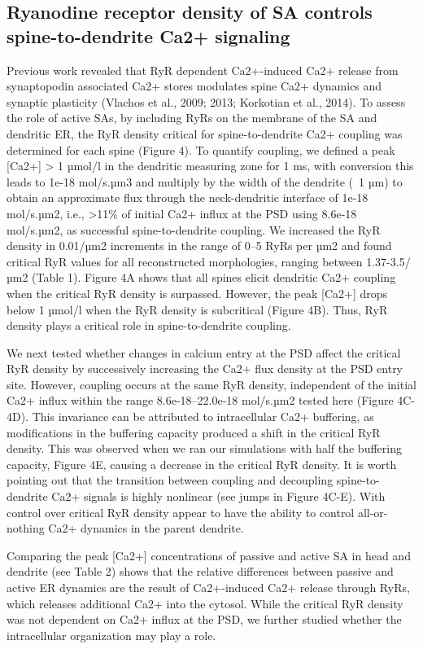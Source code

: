 \documentclass[fleqn,10pt]{wlscirep}
\begin{document}
\subsection*{Ryanodine receptor density of SA controls spine-to-dendrite Ca2+ signaling} Previous work revealed that RyR dependent Ca2+-induced Ca2+ release from synaptopodin associated Ca2+ stores modulates spine Ca2+ dynamics and synaptic plasticity (Vlachos et al., 2009; 2013; Korkotian et al., 2014). To assess the role of active SAs, by including RyRs on the membrane of the SA and dendritic ER, the RyR density critical for spine-to-dendrite Ca2+ coupling was determined for each spine (Figure 4). To quantify coupling, we defined a peak [Ca2+] > 1 µmol/l in the dendritic measuring zone for 1 ms, with conversion this leads to 1e-18 mol/s.µm3 and multiply by the width of the dendrite (~1 µm) to obtain an approximate flux through the neck-dendritic interface of 1e-18 mol/s.µm2, i.e., >11\% of initial Ca2+ influx at the PSD using 8.6e-18 mol/s.µm2,  as successful spine-to-dendrite coupling. We increased the RyR density in 0.01/µm2 increments in the range of 0–5 RyRs per µm2 and found critical RyR values for all reconstructed morphologies, ranging between 1.37-3.5/µm2 (Table 1). Figure 4A shows that all spines elicit dendritic Ca2+ coupling when the critical RyR density is surpassed. However, the peak [Ca2+] drops below 1 µmol/l when the RyR density is subcritical (Figure 4B). Thus, RyR density plays a critical role in spine-to-dendrite coupling.

We next tested whether changes in calcium entry at the PSD affect the critical RyR density by successively increasing the Ca2+ flux density at the PSD entry site. However, coupling occurs at the same RyR density, independent of the initial Ca2+ influx within the range 8.6e-18--22.0e-18 mol/s.µm2 tested here (Figure 4C-4D). This invariance can be attributed to intracellular Ca2+ buffering, as modifications in the buffering capacity produced a shift in the critical RyR density. This was observed when we ran our simulations with half the buffering capacity, Figure 4E, causing a decrease in the critical RyR density. It is worth pointing out that the transition between coupling and decoupling spine-to-dendrite Ca2+ signals is highly nonlinear (see jumps in Figure 4C-E). With control over critical RyR density appear to have the ability to control all-or-nothing Ca2+ dynamics in the parent dendrite.

Comparing the peak [Ca2+] concentrations of passive and active SA in head and dendrite (see Table 2) shows that the relative differences between passive and active ER dynamics are the result of Ca2+-induced Ca2+ release through RyRs, which releases additional Ca2+ into the cytosol. While the critical RyR density was not dependent on Ca2+ influx at the PSD, we further studied whether the intracellular organization may play a role. 
\end{document}
